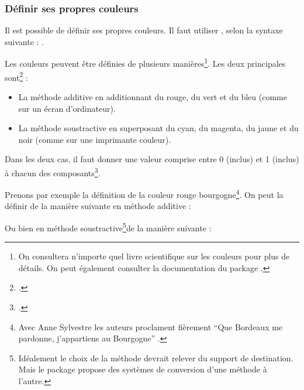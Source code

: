 \subsubsection{Définir ses propres couleurs}

Il est possible de définir ses propres couleurs. Il faut  utiliser , selon la syntaxe suivante : 
.


Les couleurs peuvent être définies de plusieurs manières\footnote{On consultera n'importe quel livre scientifique sur les couleurs pour plus de détails. On peut également consulter la documentation du package .}. Les deux principales sont\footcite[Il existe aussi la méthode de définition par la longueur d'onde pour les couleurs de l'arc en ciel, par pourcentage de gris pour les différents niveaux de gris, ainsi que par teinte, saturation et luminosité, mais ceci nécessiterait un cours de physique lumineuse. Pour  les personnes intéressées par les détails, consulter][]{xcolor_methode} :
\begin{itemize}
\item La méthode additive en additionnant du rouge, du vert et du bleu (comme sur un écran d'ordinateur).
\item La méthode soustractive en superposant du cyan, du magenta, du jaune et du noir (comme sur une imprimante couleur).
\end{itemize}


Dans les deux cas, il faut  donner une valeur comprise entre 0 (inclus) et 1 (inclus) à chacun des composants\footcite[On pourra trouver une série de code couleur sur le site][]{codecouleur}.



Prenons par exemple la définition de la couleur \textcolor{rougebourgogne}{rouge bourgogne}\footnote{Avec Anne Sylvestre les auteurs proclament fièrement \enquote{Que Bordeaux me pardonne, j’appartiens au Bourgogne} \parencite{romaneconti}.}.
On peut la définir de la manière suivante en méthode additive :

\begin{latexcode}
\end{latexcode}

Ou bien en méthode soustractive\footnote{Idéalement le choix de  la méthode devrait relever du support de destination. Mais le package  propose des systèmes de conversion d'une méthode à l'autre.}de la manière suivante :

